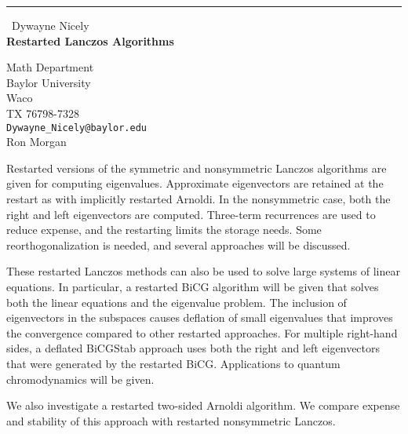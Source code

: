 \documentclass{report}
\begin{document}
\begin{center}
\rule{6in}{1pt} \
{\large Dywayne Nicely \\
{\bf Restarted Lanczos Algorithms}}

Math Department \\ Baylor University \\ Waco \\ TX 76798-7328
\\
{\tt Dywayne{\_}Nicely@baylor.edu}\\
Ron Morgan\end{center}

Restarted versions of the symmetric and nonsymmetric Lanczos algorithms
are given for computing eigenvalues. Approximate eigenvectors are
retained at the restart as with implicitly restarted Arnoldi. In the
nonsymmetric case, both the right and left eigenvectors are computed.
Three-term recurrences are used to reduce expense, and the restarting
limits the storage needs. Some reorthogonalization is needed, and several
approaches will be discussed.

These restarted Lanczos methods can also be used to solve large systems
of linear equations. In particular, a restarted BiCG algorithm will be
given that solves both the linear equations and the eigenvalue problem.
The inclusion of eigenvectors in the subspaces causes deflation of small
eigenvalues that improves the convergence compared to other restarted
approaches. For multiple right-hand sides, a deflated BiCGStab approach
uses both the right and left eigenvectors that were generated by the
restarted BiCG. Applications to quantum chromodynamics will be given.

We also investigate a restarted two-sided Arnoldi algorithm. We compare
expense and stability of this approach with restarted nonsymmetric
Lanczos.
\end{document}
